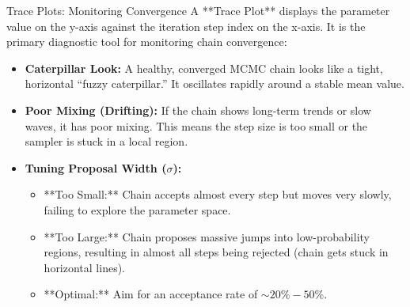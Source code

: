\documentclass[9pt]{beamer}
\begin{document}
\begin{frame}{Trace Plots: Monitoring Convergence}
  A **Trace Plot** displays the parameter value on the y-axis against the iteration step index on the x-axis. It is the primary diagnostic tool for monitoring chain convergence:
  \begin{itemize}
    \item \textbf{Caterpillar Look:} A healthy, converged MCMC chain looks like a tight, horizontal ``fuzzy caterpillar.'' It oscillates rapidly around a stable mean value.
    \item \textbf{Poor Mixing (Drifting):} If the chain shows long-term trends or slow waves, it has poor mixing. This means the step size is too small or the sampler is stuck in a local region.
    \item \textbf{Tuning Proposal Width ($\sigma$):}
      \begin{itemize}
        \item **Too Small:** Chain accepts almost every step but moves very slowly, failing to explore the parameter space.
        \item **Too Large:** Chain proposes massive jumps into low-probability regions, resulting in almost all steps being rejected (chain gets stuck in horizontal lines).
        \item **Optimal:** Aim for an acceptance rate of $\sim 20\% - 50\%$.
      \end{itemize}
  \end{itemize}
\end{frame}
\end{document}
